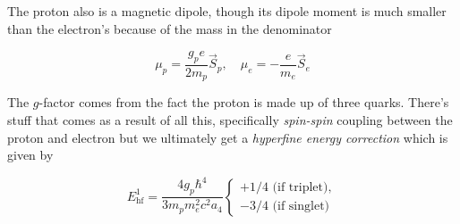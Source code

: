 \documentclass[svgnames]{article}
\begin{document}
The proton also is a magnetic dipole, though its dipole moment is much smaller than the electron's 
because of the mass in the denominator 

\[
\mu_p = \frac{g_p e}{2m_p}\vec{S}_p, \quad \mu_e = -\frac{e}{m_e}\vec{S}_e
\] \vspace{3px}

The $g$-factor comes from the fact the proton is made up of three quarks. There's stuff that comes as 
a result of all this, specifically  \textit{spin-spin}  coupling between the proton and electron but 
we ultimately get a \textit{hyperfine energy correction} which is given by 

\[
    E_\text{hf}^1 = \frac{4g_p \hbar^{4}}{3m_p m_e^2 c^2 a_4} \begin{cases} +1/4 \text{ (if triplet)},  \\ -3/4 \text{ (if singlet)}  \end{cases}
\] \vspace{3px}
\end{document}
